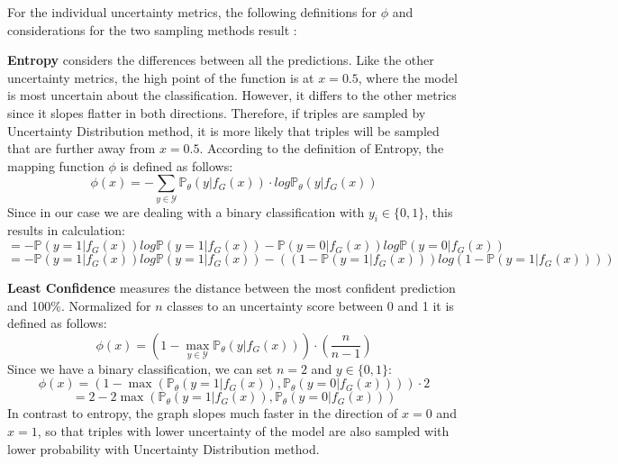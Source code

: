 For the individual uncertainty metrics, the following definitions for $\phi$ and considerations for the two sampling methods result \cite{human-in-the-loop}:

\textbf{Entropy} considers the differences between all the predictions.
Like the other uncertainty metrics, the high point of the function is at $x = 0.5$, where the model is most uncertain about the classification.
However, it differs to the other metrics since it slopes flatter in both directions.
Therefore, if triples are sampled by Uncertainty Distribution method, it is more likely that triples will be sampled that are further away from $x=0.5$.
According to the definition of Entropy, the mapping function $\phi$ is defined as follows:
\begin{equation}
    \phi(x) = - \sum_{y \in \mathcal{Y}}{\mathds{P}_{\theta}(y | f_G(x)) \cdot log \mathds{P}_{\theta}(y | f_G(x))}
\end{equation}
Since in our case we are dealing with a binary classification with $y_i \in \{0,1\}$, this results in calculation:
\begin{equation}
= - \mathds{P}(y = 1| f_G(x)) log \mathds{P}(y = 1 | f_G(x))
- \mathds{P}(y = 0| f_G(x)) log \mathds{P}(y = 0 | f_G(x))
\end{equation}
\begin{equation}
= - \mathds{P}(y = 1| f_G(x) ) log \mathds{P}(y = 1 | f_G(x))
- ((1 - \mathds{P}(y = 1 | f_G(x)))
     log(1 - \mathds{P}(y = 1 | f_G(x))))
\end{equation}

\textbf{Least Confidence} 
measures the distance between the most confident prediction and 100\%.
Normalized for $n$ classes to an uncertainty score between 0 and 1 it is defined as follows:
\begin{equation}
    \phi(x) = (1 - \max_{y \in \mathcal{Y}}{\mathds{P}_{\theta}(y | f_G(x))}) \cdot \left(\frac{n}{n-1}\right)
\end{equation}
Since we have a binary classification, we can set $n = 2$ and $y \in \{0,1\}$:
\begin{equation}
    \phi(x) = (1 - \max({\mathds{P}_{\theta}(y = 1| f_G(x)), \mathds{P}_{\theta}(y = 0| f_G(x))})) \cdot 2
\end{equation}
\begin{equation} \label{eq:leastconfidence}
    = 2 - 2 \max({\mathds{P}_{\theta}(y = 1| f_G(x)), \mathds{P}_{\theta}(y = 0| f_G(x))})
\end{equation}
In contrast to entropy, the graph slopes much faster in the direction of $x = 0$ and $x = 1$, so that triples with lower uncertainty of the model are also sampled with lower probability with Uncertainty Distribution method.

